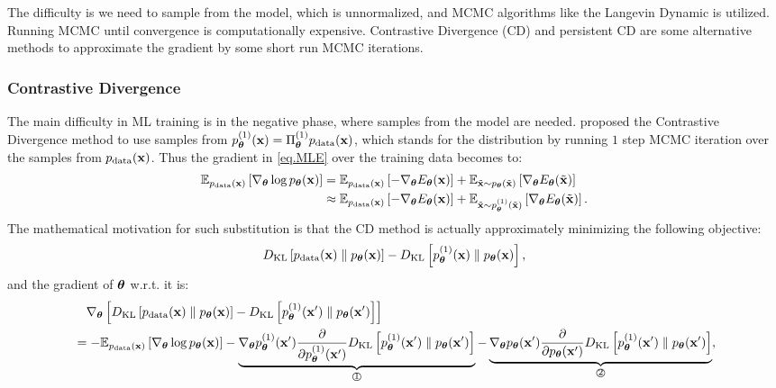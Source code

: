 \documentclass{article}
\begin{document}
The difficulty is we need to sample from the model, which is unnormalized, and MCMC algorithms like the Langevin Dynamic is utilized. Running MCMC until convergence is computationally expensive. Contrastive Divergence (CD) \citep{CDhinton} and persistent CD \citep{PCD} are some alternative methods to approximate the gradient by some short run MCMC iterations.

\subsubsection{Contrastive Divergence}\label{sec.CD}
The main difficulty in ML training is in the negative phase, where samples from the model are needed. \citeauthor{CDhinton} proposed the Contrastive Divergence method to use samples from $p^{(1)}_{{\bm{\theta}}}({\mathbf{x}}) = \Pi_{\bm{\theta}}^{(1)}p_{\rm{data}}({\mathbf{x}})$, which stands for the distribution by running $1$ step MCMC iteration over the samples from $p_{\rm{data}}({\mathbf{x}})$. Thus the gradient in \eqref{eq.MLE} over the training data becomes to:
\begin{equation}\label{eq.CD}
    \begin{aligned}
        \mathbb{E}_{p_{\rm{data}}({\mathbf{x}})}\left[  \nabla_{{\bm{\theta}}}\log p_{\bm{\theta}}({\mathbf{x}}) \right]
        &= \mathbb{E}_{p_{\rm{data}}({\mathbf{x}})}\left[ -\nabla_{\bm{\theta}} E_{\bm{\theta}}({\mathbf{x}}) \right] + \mathbb{E}_{\tilde{{\mathbf{x}}} \sim p_{\bm{\theta}}(\tilde{{\mathbf{x}}})}\left[ \nabla_{\bm{\theta}} E_{\bm{\theta}}(\tilde{{\mathbf{x}}}) \right] \\
        &\approx \mathbb{E}_{p_{\rm{data}}({\mathbf{x}})}\left[ -\nabla_{\bm{\theta}} E_{\bm{\theta}}({\mathbf{x}}) \right] + \mathbb{E}_{\tilde{{\mathbf{x}}} \sim p^{(1)}_{{\bm{\theta}}}(\tilde{{\mathbf{x}}})}\left[ \nabla_{\bm{\theta}} E_{\bm{\theta}}(\tilde{{\mathbf{x}}}) \right].
    \end{aligned}
\end{equation}
The mathematical motivation for such substitution is that the CD method is actually approximately minimizing the following objective:
\begin{equation}
    D_{\mathrm{KL}}\left[ p_{\rm{data}}({\mathbf{x}})\parallel p_{\bm{\theta}}({\mathbf{x}}) \right] - D_{\mathrm{KL}}\left[ p^{(1)}_{{\bm{\theta}}}({\mathbf{x}}) \parallel p_{\bm{\theta}}({\mathbf{x}})\right],
\end{equation}
and the gradient of ${\bm{\theta}}$ w.r.t. it is:
\begin{equation}\label{eq.gradCD}
    \begin{aligned}
        &\quad \nabla_{\bm{\theta}}\left[ D_{\mathrm{KL}}\left[ p_{\rm{data}}({\mathbf{x}})\parallel p_{\bm{\theta}}({\mathbf{x}}) \right] - D_{\mathrm{KL}}\left[ p^{(1)}_{{\bm{\theta}}}({\mathbf{x}}') \parallel p_{\bm{\theta}}({\mathbf{x}}')\right] \right] \\
        &= -\mathbb{E}_{p_{\rm{data}}({\mathbf{x}})}\left[ \nabla_{\bm{\theta}}\log p_{\bm{\theta}}({\mathbf{x}}) \right] - 
        \underbrace{\nabla_{\bm{\theta}} p_{\bm{\theta}}^{(1)}({\mathbf{x}}')\frac{\partial}{\partial p_{\bm{\theta}}^{(1)}({\mathbf{x}}')}D_{\mathrm{KL}}\left[ p^{(1)}_{{\bm{\theta}}}({\mathbf{x}}') \parallel p_{\bm{\theta}}({\mathbf{x}}')\right]}_{\text{\textcircled{1}}} - 
        \underbrace{\nabla_{\bm{\theta}} p_{\bm{\theta}}({\mathbf{x}}')\frac{\partial}{\partial p_{\bm{\theta}}({\mathbf{x}}')}D_{\mathrm{KL}}\left[ p^{(1)}_{{\bm{\theta}}}({\mathbf{x}}') \parallel p_{\bm{\theta}}({\mathbf{x}}')\right]}_{\text{\textcircled{2}}}, \\
    \end{aligned}
\end{equation}
\end{document}
